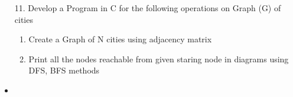 \documentclass{article}
\newcommand{\answer}{\item [$\rightarrow$]}
\begin{document}
	\begin{itemize}
		\item [11.] Develop a Program in C for the following operations on Graph (G) of cities

		\begin{enumerate}[label=\alph*.]
			\item Create a Graph of N cities using adjacency matrix
			\item Print all the nodes reachable from given staring node in diagrams using DFS, BFS methods
		\end{enumerate}

		\answer \inputminted{c}{../Program11.c}
	\end{itemize}
\end{document}
